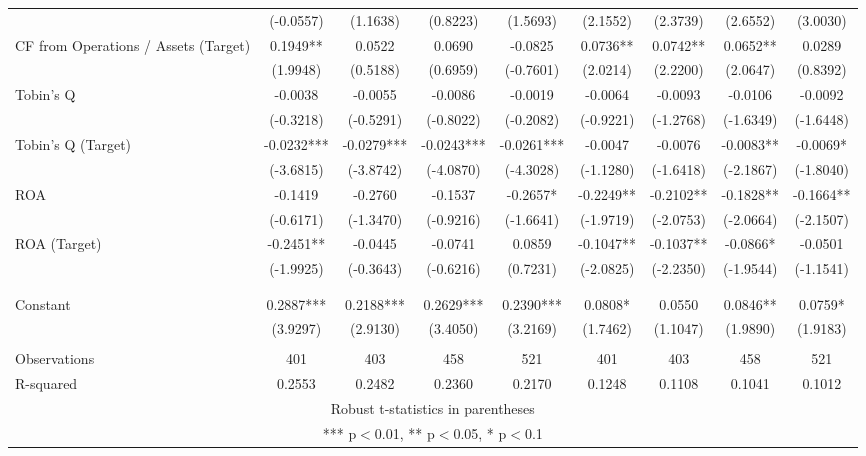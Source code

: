 \documentclass[12pt]{article}
\begin{document}
\begin{table}
\begin{adjustbox}{max width=\textwidth}
\begin{tabular}{lcccccccc}
			 & (-0.0557) & (1.1638) & (0.8223) & (1.5693) & (2.1552) & (2.3739) & (2.6552) & (3.0030) \\
			CF from Operations / Assets (Target) & 0.1949** & 0.0522 & 0.0690 & -0.0825 & 0.0736** & 0.0742** & 0.0652** & 0.0289 \\
			 & (1.9948) & (0.5188) & (0.6959) & (-0.7601) & (2.0214) & (2.2200) & (2.0647) & (0.8392) \\
			Tobin's Q & -0.0038 & -0.0055 & -0.0086 & -0.0019 & -0.0064 & -0.0093 & -0.0106 & -0.0092 \\
			 & (-0.3218) & (-0.5291) & (-0.8022) & (-0.2082) & (-0.9221) & (-1.2768) & (-1.6349) & (-1.6448) \\
			Tobin's Q (Target) & -0.0232*** & -0.0279*** & -0.0243*** & -0.0261*** & -0.0047 & -0.0076 & -0.0083** & -0.0069* \\
			 & (-3.6815) & (-3.8742) & (-4.0870) & (-4.3028) & (-1.1280) & (-1.6418) & (-2.1867) & (-1.8040) \\
			ROA & -0.1419 & -0.2760 & -0.1537 & -0.2657* & -0.2249** & -0.2102** & -0.1828** & -0.1664** \\
			 & (-0.6171) & (-1.3470) & (-0.9216) & (-1.6641) & (-1.9719) & (-2.0753) & (-2.0664) & (-2.1507) \\
			ROA (Target) & -0.2451** & -0.0445 & -0.0741 & 0.0859 & -0.1047** & -0.1037** & -0.0866* & -0.0501 \\
			 & (-1.9925) & (-0.3643) & (-0.6216) & (0.7231) & (-2.0825) & (-2.2350) & (-1.9544) & (-1.1541) \\
			 \\
			 &  &  &  &  &  &  &  &  \\
			Constant & 0.2887*** & 0.2188*** & 0.2629*** & 0.2390*** & 0.0808* & 0.0550 & 0.0846** & 0.0759* \\
			 & (3.9297) & (2.9130) & (3.4050) & (3.2169) & (1.7462) & (1.1047) & (1.9890) & (1.9183) \\
			 &  &  &  &  &  &  &  &  \\
			Observations & 401 & 403 & 458 & 521 & 401 & 403 & 458 & 521 \\
			 R-squared & 0.2553 & 0.2482 & 0.2360 & 0.2170 & 0.1248 & 0.1108 & 0.1041 & 0.1012 \\ \hline
			\multicolumn{9}{c}{ Robust t-statistics in parentheses} \\
			\multicolumn{9}{c}{ *** p$<$0.01, ** p$<$0.05, * p$<$0.1} \\
			\end{tabular}			
	\end{adjustbox}
\end{table}
\end{document}

